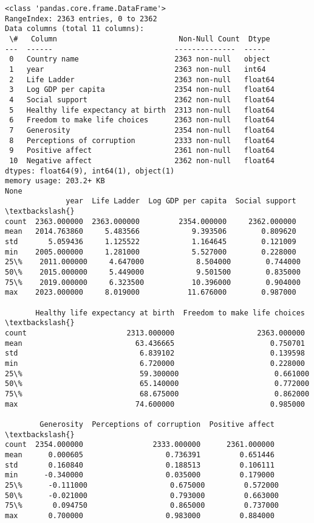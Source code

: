 \documentclass[11pt]{article}
\begin{document}
    \begin{Verbatim}[commandchars=\\\{\}]
<class 'pandas.core.frame.DataFrame'>
RangeIndex: 2363 entries, 0 to 2362
Data columns (total 11 columns):
 \#   Column                            Non-Null Count  Dtype
---  ------                            --------------  -----
 0   Country name                      2363 non-null   object
 1   year                              2363 non-null   int64
 2   Life Ladder                       2363 non-null   float64
 3   Log GDP per capita                2354 non-null   float64
 4   Social support                    2362 non-null   float64
 5   Healthy life expectancy at birth  2313 non-null   float64
 6   Freedom to make life choices      2363 non-null   float64
 7   Generosity                        2354 non-null   float64
 8   Perceptions of corruption         2333 non-null   float64
 9   Positive affect                   2361 non-null   float64
 10  Negative affect                   2362 non-null   float64
dtypes: float64(9), int64(1), object(1)
memory usage: 203.2+ KB
None
              year  Life Ladder  Log GDP per capita  Social support  \textbackslash{}
count  2363.000000  2363.000000         2354.000000     2362.000000
mean   2014.763860     5.483566            9.393506        0.809620
std       5.059436     1.125522            1.164645        0.121009
min    2005.000000     1.281000            5.527000        0.228000
25\%    2011.000000     4.647000            8.504000        0.744000
50\%    2015.000000     5.449000            9.501500        0.835000
75\%    2019.000000     6.323500           10.396000        0.904000
max    2023.000000     8.019000           11.676000        0.987000

       Healthy life expectancy at birth  Freedom to make life choices  \textbackslash{}
count                       2313.000000                   2363.000000
mean                          63.436665                      0.750701
std                            6.839102                      0.139598
min                            6.720000                      0.228000
25\%                           59.300000                      0.661000
50\%                           65.140000                      0.772000
75\%                           68.675000                      0.862000
max                           74.600000                      0.985000

        Generosity  Perceptions of corruption  Positive affect  \textbackslash{}
count  2354.000000                2333.000000      2361.000000
mean      0.000605                   0.736391         0.651446
std       0.160840                   0.188513         0.106111
min      -0.340000                   0.035000         0.179000
25\%      -0.111000                   0.675000         0.572000
50\%      -0.021000                   0.793000         0.663000
75\%       0.094750                   0.865000         0.737000
max       0.700000                   0.983000         0.884000


\end{Verbatim}
\end{document}
